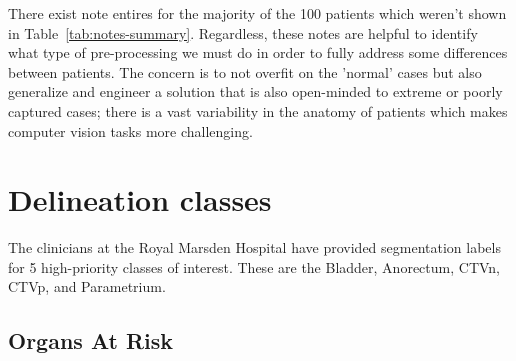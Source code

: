\documentclass[11pt,twoside]{report}
\begin{document}
There exist note entires for the majority of the 100 patients which weren't shown in Table~\ref{tab:notes-summary}. Regardless, these notes are helpful to identify what type of pre-processing we must do in order to fully address some differences between patients. The concern is to not overfit on the 'normal' cases but also generalize and engineer a solution that is also open-minded to extreme or poorly captured cases; there is a vast variability in the anatomy of patients which makes computer vision tasks more challenging.

\section{Delineation classes}\label{sec:data-delineation-classes}

The clinicians at the Royal Marsden Hospital have provided segmentation labels for 5 high-priority classes of interest. These are the Bladder, Anorectum, CTVn, CTVp, and Parametrium.

\subsection{Organs At Risk}\label{sec:data-organs-at-risk}
\end{document}
